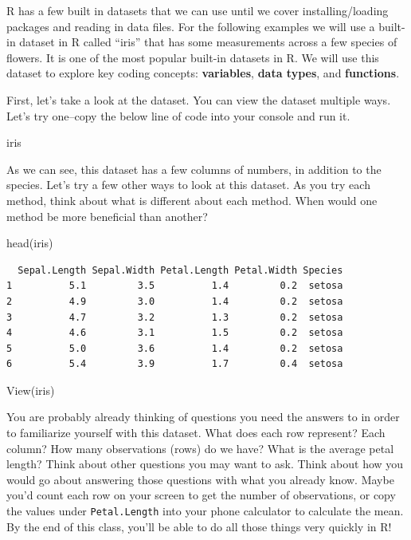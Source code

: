 \documentclass[
  letterpaper,
  DIV=11,
  numbers=noendperiod]{scrreprt}
\newenvironment{Shaded}{\begin{snugshade}}{\end{snugshade}}
\newcommand{\FunctionTok}[1]{\textcolor[rgb]{0.28,0.35,0.67}{#1}}
\newcommand{\NormalTok}[1]{\textcolor[rgb]{0.00,0.23,0.31}{#1}}
\begin{document}
R has a few built in datasets that we can use until we cover
installing/loading packages and reading in data files. For the following
examples we will use a built-in dataset in R called ``iris'' that has
some measurements across a few species of flowers. It is one of the most
popular built-in datasets in R. We will use this dataset to explore key
coding concepts: \textbf{variables}, \textbf{data types}, and
\textbf{functions}.

First, let's take a look at the dataset. You can view the dataset
multiple ways. Let's try one--copy the below line of code into your
console and run it.

\begin{Shaded}
\begin{Highlighting}[]
\NormalTok{iris}
\end{Highlighting}
\end{Shaded}

As we can see, this dataset has a few columns of numbers, in addition to
the species. Let's try a few other ways to look at this dataset. As you
try each method, think about what is different about each method. When
would one method be more beneficial than another?

\begin{Shaded}
\begin{Highlighting}[]
\FunctionTok{head}\NormalTok{(iris)}
\end{Highlighting}
\end{Shaded}

\begin{verbatim}
  Sepal.Length Sepal.Width Petal.Length Petal.Width Species
1          5.1         3.5          1.4         0.2  setosa
2          4.9         3.0          1.4         0.2  setosa
3          4.7         3.2          1.3         0.2  setosa
4          4.6         3.1          1.5         0.2  setosa
5          5.0         3.6          1.4         0.2  setosa
6          5.4         3.9          1.7         0.4  setosa
\end{verbatim}

\begin{Shaded}
\begin{Highlighting}[]
\FunctionTok{View}\NormalTok{(iris)}
\end{Highlighting}
\end{Shaded}

You are probably already thinking of questions you need the answers to
in order to familiarize yourself with this dataset. What does each row
represent? Each column? How many observations (rows) do we have? What is
the average petal length? Think about other questions you may want to
ask. Think about how you would go about answering those questions with
what you already know. Maybe you'd count each row on your screen to get
the number of observations, or copy the values under
\texttt{Petal.Length} into your phone calculator to calculate the mean.
By the end of this class, you'll be able to do all those things very
quickly in R!
\end{document}
